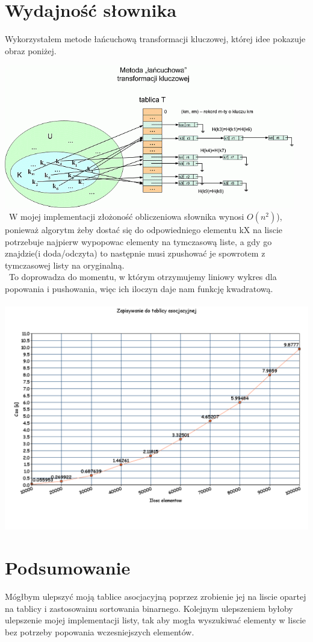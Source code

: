 \documentclass[11pt]{article}
\begin{document}
\section{Wydajność słownika}
Wykorzystałem metode łańcuchową transformacji kluczowej, której idee pokazuje obraz poniżej.
\par\vspace{\baselineskip}
\includegraphics[width=5in]{lancuchowa.png}\\\
W mojej implementacji złożoność obliczeniowa słownika wynosi $O(n^2)$), ponieważ algorytm żeby dostać się do odpowiedniego elementu kX na liscie potrzebuje najpierw wypopowac elementy na tymczasową liste, a gdy go znajdzie(i doda/odczyta) to następnie musi zpushować je spowrotem z tymczasowej listy na oryginalną.\\\
To doprowadza do momentu, w którym otrzymujemy liniowy wykres dla popowania i pushowania, więc ich iloczyn daje nam funkcję kwadratową.\\\
\includegraphics[width=6in]{slownik.png}


\section{Podsumowanie}
Mógłbym ulepszyć moją tablice asocjacyjną poprzez zrobienie jej na liscie opartej na tablicy i zastosowainu sortowania binarnego.
Kolejnym ulepszeniem byłoby ulepszenie mojej implementacji listy, tak aby mogła wyszukiwać elementy w liscie bez potrzeby popowania wczesniejszych elementów.
\end{document}
